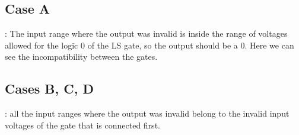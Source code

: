 \subsection*{Case A}:
\newline
The input range where the output was invalid is inside
 the range of voltages allowed for the logic 0 of the LS gate, 
 so the output should be a 0. Here we can see the incompatibility 
 between the gates.
\subsection*{Cases B, C, D}: all the input ranges where the output was invalid
 belong to the invalid input voltages of the gate that is connected 
 first. 

